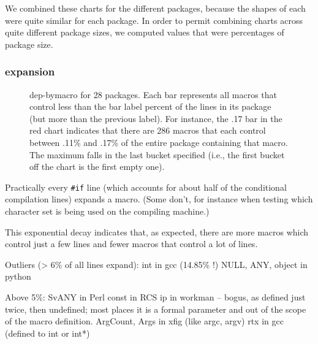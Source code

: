 \documentclass[10pt]{article}
\begin{document}
    We combined these charts for the different packages, because the shapes
      of each were quite similar for each package.  In order to permit
      combining charts across quite different package sizes, we computed
      values that were percentages of package size.

   \subsubsection{expansion}

\begin{figure}
\centerline{}
\bigskip
\centerline{}
\caption{dep-bymacro for 28 packages.
  Each bar represents all macros that control less than the bar label
  percent of the lines in its package (but more than the previous label).
  For instance, the .17 bar in the red chart indicates that there are 286
  macros that each control between .11\% and .17\% of the entire package
  containing that macro.  The maximum falls in the last bucket specified
  (i.e., the first bucket off the chart is the first empty one).}
\label{fig:dep-bymacro}
\end{figure}

Practically every {\tt \#if} line (which accounts for about half of the
conditional compilation lines) expands a macro.  (Some don't, for instance
when testing which character set is being used on the compiling machine.)

        This exponential decay indicates that, as expected, there are more
          macros which control just a few lines and fewer macros that
          control a lot of lines.

        Outliers (> 6\% of all lines expand):
          int in gcc (14.85\% !)
          NULL, ANY, object in python

        Above 5\%: 
          SvANY in Perl
          const in RCS
          ip in workman -- bogus, as defined just twice, then undefined;
                  most places it is a formal parameter and out of the scope
                  of the macro definition.
          ArgCount, Args in xfig (like argc, argv)
          rtx in gcc (defined to int or int*)
\end{document}
